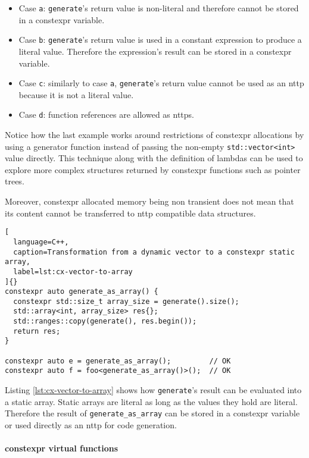 \documentclass[../main]{subfiles}
\begin{document}
\begin{itemize}
\item Case \lstinline{a}: \lstinline{generate}'s return value is non-literal
      and therefore cannot be stored in a \gls{constexpr} variable.
\item Case \lstinline{b}: \lstinline{generate}'s return value is used in a
      constant expression to produce a literal value.
      Therefore the expression's result can be stored in a \gls{constexpr} variable.
\item Case \lstinline{c}: similarly to case \lstinline{a},
      \lstinline{generate}'s return value cannot be used as an \gls{nttp} because it
      is not a literal value.
\item Case \lstinline{d}: function references are allowed as \glspl{nttp}.
\end{itemize}

Notice how the last example works around restrictions of \gls{constexpr} allocations
by using a generator function instead of passing the non-empty
\lstinline{std::vector<int>} value directly. This technique along with the
definition of lambdas can be used to explore more complex structures returned by
\gls{constexpr} functions such as pointer trees.

Moreover, \gls{constexpr} allocated memory being non transient does not mean that its
content cannot be transferred to \gls{nttp} compatible data structures.

\begin{lstlisting}[
  language=C++,
  caption=Transformation from a dynamic vector to a constexpr static array,
  label=lst:cx-vector-to-array
]{}
constexpr auto generate_as_array() {
  constexpr std::size_t array_size = generate().size();
  std::array<int, array_size> res{};
  std::ranges::copy(generate(), res.begin());
  return res;
}

constexpr auto e = generate_as_array();         // OK
constexpr auto f = foo<generate_as_array()>();  // OK
\end{lstlisting}

Listing \ref{lst:cx-vector-to-array} shows how \lstinline{generate}'s result
can be evaluated into a static array. Static arrays are literal as long
as the values they hold are literal. Therefore the result of
\lstinline{generate_as_array} can be stored in a \gls{constexpr} variable or used
directly as an \gls{nttp} for code generation.

\paragraph{
  \gls{constexpr} virtual functions
}
\end{document}
